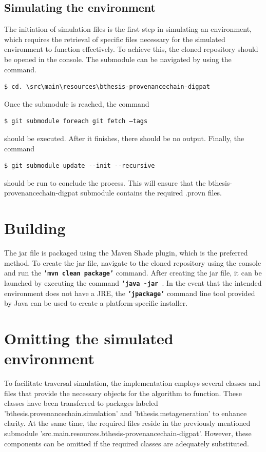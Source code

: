 \documentclass[
  digital,     %
  oneside,     %
  nosansbold,  %
  nocolorbold, %
  lof,         %
  lot,         %
]{fithesis4}
\begin{document}
\subsection{Simulating the environment}
The initiation of simulation files is the first step in simulating an environment, which requires the retrieval of specific files necessary for the simulated environment to function effectively. To achieve this, the cloned repository should be opened in the console. The submodule can be navigated by using the command.

\begin{verbatim}
$ cd. \src\main\resources\bthesis-provenancechain-digpat  
\end{verbatim}

Once the submodule is reached, the command 

\begin{verbatim}
$ git submodule foreach git fetch –tags
\end{verbatim}

should be executed. After it finishes, there should be no output. Finally, the command

\begin{verbatim}
$ git submodule update --init --recursive  
\end{verbatim}

should be run to conclude the process. This will ensure that the bthesis-provenancechain-digpat submodule contains the required .provn files.

\section{Building}
The jar file is packaged using the Maven Shade plugin, which is the preferred method. To create the jar file, navigate to the cloned repository using the console and run the \textbf{\texttt{'mvn clean package'}} command. After creating the jar file, it can be launched by executing the command \textbf{\texttt{'java -jar }}. In the event that the intended environment does not have a JRE, the \textbf{\texttt{'jpackage'}} command line tool provided by Java can be used to create a platform-specific installer.

\section{Omitting the simulated environment}
To facilitate traversal simulation, the implementation employs several classes and files that provide the necessary objects for the algorithm to function. These classes have been transferred to packages labeled 'bthesis.provenancechain.simulation' and 'bthesis.metageneration' to enhance clarity. At the same time, the required files reside in the previously mentioned submodule 'src.main.resources.bthesis-provenancechain-digpat'. However, these components can be omitted if the required classes are adequately substituted.
\shorthandon{-}
\end{document}
